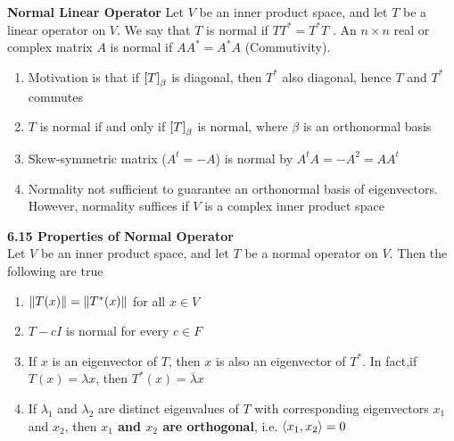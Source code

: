 \documentclass[11pt]{article}
\begin{document}
\begin{defn*}
    \textbf{Normal Linear Operator} Let $V$ be an inner product space, and let $T$ be a linear operator on $V$. We say that $T$ is normal if $TT^* = T^*T$ . An $n\times n$ real or complex matrix $A$ is normal if $AA^* = A^*A$ (Commutivity). 
    \begin{enumerate}
        \item Motivation is that if $\left[ T \right]_{\beta}$ is diagonal, then $T^*$ also diagonal, hence $T$ and $T^*$ commutes
        \item $T$ is normal if and only if $\left[ T \right]_{\beta}$ is normal, where $\beta$ is an orthonormal basis
        \item Skew-symmetric matrix ($A^t = -A$) is normal by $A^tA = -A^2 = AA^t$
        \item Normality not sufficient to guarantee an orthonormal basis of eigenvectors. However, normality suffices if $V$ is a complex inner product space
    \end{enumerate}
\end{defn*}

\begin{theorem*}
    \textbf{6.15 Properties of Normal Operator} \\ 
    Let $V$ be an inner product space, and let $T$ be a normal operator on $V$. Then the following are true
    \begin{enumerate}
        \item $\left\lVert T(x)\right\rVert = \left\lVert T^*(x)\right\rVert$ for all $x\in V$
        \item $T - cI$ is normal for every $c\in F$
        \item If $x$ is an eigenvector of $T$, then $x$ is also an eigenvector of $T^*$. In fact,if $T(x) = \lambda x$, then $T^*(x) = \overline{\lambda} x$
        \item If $\lambda_1$ and $\lambda_2$ are distinct eigenvalues of $T$ with corresponding eigenvectors $x_1$ and $x_2$, then \textbf{$x_1$ and $x_2$ are orthogonal}, i.e. $\langle x_1,x_2\rangle = 0$
    \end{enumerate}
\end{theorem*}
\end{document}
